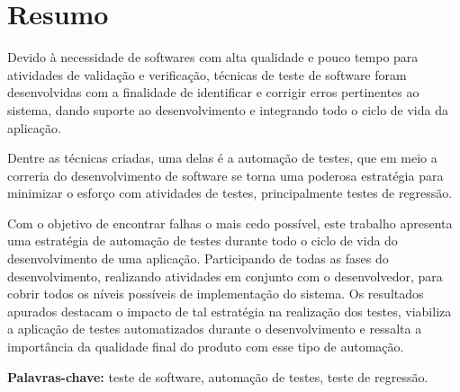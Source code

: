 \chapter*{Resumo}

Devido à necessidade de softwares com alta qualidade e pouco tempo para atividades de validação e verificação, técnicas de teste de software foram desenvolvidas com a finalidade de identificar e corrigir erros pertinentes ao sistema, dando suporte ao desenvolvimento e integrando todo o ciclo de vida da aplicação. 

Dentre as técnicas criadas, uma delas é a automação de testes, que em meio a correria do desenvolvimento de software se torna uma poderosa estratégia para minimizar o esforço com atividades de testes, principalmente testes de regressão. 

Com o objetivo de encontrar falhas o mais cedo possível, este trabalho apresenta uma estratégia de automação de testes durante todo o ciclo de vida do desenvolvimento de uma aplicação. Participando de todas as fases do desenvolvimento, realizando atividades em conjunto com o desenvolvedor, para cobrir todos os níveis possíveis de implementação do sistema. Os resultados apurados destacam o impacto de tal estratégia na realização dos testes, viabiliza a aplicação de testes automatizados durante o desenvolvimento e ressalta a importância da qualidade final do produto com esse tipo de automação.


\textbf{Palavras-chave:} teste de software, automação de testes, teste de regressão.
